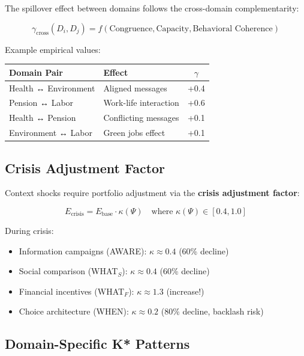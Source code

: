 The spillover effect between domains follows the cross-domain complementarity:

\begin{equation}
\gamma_{\text{cross}}(D_i, D_j) = f(\text{Congruence}, \text{Capacity}, \text{Behavioral Coherence})
\end{equation}

Example empirical values:
\begin{center}
\begin{tabular}{@{}llc@{}}
\toprule
\textbf{Domain Pair} & \textbf{Effect} & \textbf{$\gamma$} \\
\midrule
Health ↔ Environment & Aligned messages & +0.4 \\
Pension ↔ Labor & Work-life interaction & +0.6 \\
Health ↔ Pension & Conflicting messages & +0.1 \\
Environment ↔ Labor & Green jobs effect & +0.1 \\
\bottomrule
\end{tabular}
\end{center}

\subsection{Crisis Adjustment Factor}

Context shocks require portfolio adjustment via the \textbf{crisis adjustment factor}:

\begin{equation}
\boxed{
E_{\text{crisis}} = E_{\text{base}} \cdot \kappa(\Psi) \quad \text{where } \kappa(\Psi) \in [0.4, 1.0]
}
\end{equation}

During crisis:
\begin{itemize}[nosep]
\item Information campaigns (AWARE): $\kappa \approx 0.4$ (60\% decline)
\item Social comparison (WHAT$_S$): $\kappa \approx 0.4$ (60\% decline)
\item Financial incentives (WHAT$_F$): $\kappa \approx 1.3$ (increase!)
\item Choice architecture (WHEN): $\kappa \approx 0.2$ (80\% decline, backlash risk)
\end{itemize}

\subsection{Domain-Specific K* Patterns}

